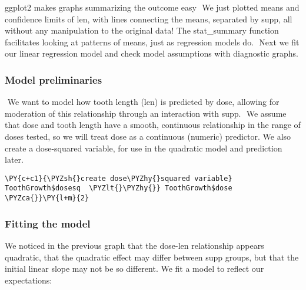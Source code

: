 ggplot2 makes graphs summarizing the outcome easy ​ We just plotted
means and confidence limits of len, with lines connecting the means,
separated by supp, all without any manipulation to the original data! ​
The stat\_summary function facilitates looking at patterns of means,
just as regression models do. ​ Next we fit our linear regression model
and check model assumptions with diagnostic graphs. ​

    \subsubsection{Model preliminaries}\label{model-preliminaries}

​ We want to model how tooth length (len) is predicted by dose, allowing
for moderation of this relationship through an interaction with supp. ​
We assume that dose and tooth length have a smooth, continuous
relationship in the range of doses tested, so we will treat dose as a
continuous (numeric) predictor. We also create a dose-squared variable,
for use in the quadratic model and prediction later. ​

    \begin{tcolorbox}[breakable, size=fbox, boxrule=1pt, pad at break*=1mm,colback=cellbackground, colframe=cellborder]
\begin{Verbatim}[commandchars=\\\{\}]
\PY{c+c1}{\PYZsh{}create dose\PYZhy{}squared variable}
ToothGrowth$dosesq  \PYZlt{}\PYZhy{}} ToothGrowth$dose \PYZca{}}\PY{l+m}{2}
\end{Verbatim}
\end{tcolorbox}

    \subsubsection{Fitting the model}\label{fitting-the-model}

We noticed in the previous graph that the dose-len relationship appears
quadratic, that the quadratic effect may differ between supp groups, but
that the initial linear slope may not be so different. We fit a model to
reflect our expectations:

